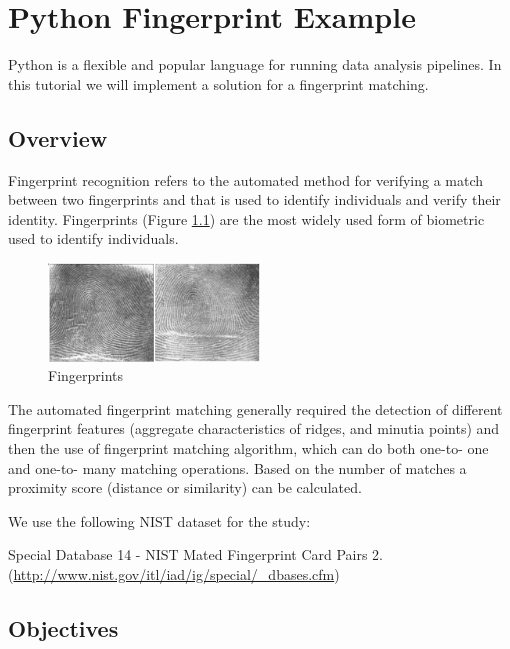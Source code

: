 \chapter{Python Fingerprint Example}\label{python-fingerprint-example}

Python is a flexible and popular language for running data analysis
pipelines. In this tutorial we will implement a solution for a
fingerprint matching.

\section{Overview}\label{overview}

Fingerprint recognition refers to the automated method for verifying a
match between two fingerprints and that is used to identify
individuals and verify their identity. Fingerprints (Figure
\ref{F:fingerprints}) are the most widely used form of biometric used
to identify individuals.


\begin{figure}[htb]
\centering
\includegraphics[width=0.5\textwidth]{notebooks/fingerprint/fingerprints.png}
\caption{Fingerprints}\label{F:fingerprints}
\end{figure}

The automated fingerprint matching generally required the detection of
different fingerprint features (aggregate characteristics of ridges, and
minutia points) and then the use of fingerprint matching algorithm,
which can do both one-to- one and one-to- many matching operations.
Based on the number of matches a proximity score (distance or
similarity) can be calculated.

We use the following NIST dataset for the study:

Special Database 14 - NIST Mated Fingerprint Card Pairs 2.
(\url{http://www.nist.gov/itl/iad/ig/special/_dbases.cfm})


\section{Objectives}\label{objectives}

